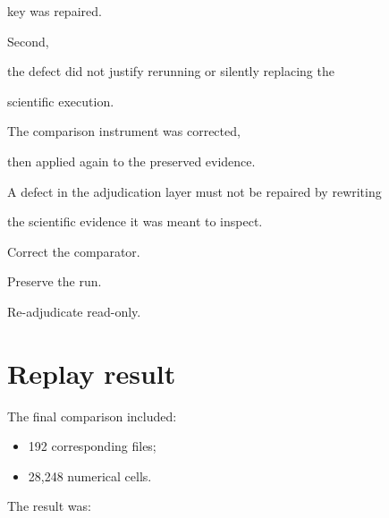 \documentclass[11pt,a4paper,oneside]{report}
\begin{document}
key was repaired.



Second,

the defect did not justify rerunning or silently replacing the

scientific execution.



The comparison instrument was corrected,

then applied again to the preserved evidence.





\begin{governingrule}



A defect in the adjudication layer must not be repaired by rewriting

the scientific evidence it was meant to inspect.



Correct the comparator.



Preserve the run.



Re-adjudicate read-only.



\end{governingrule}





\section{Replay result}



The final comparison included:



\begin{itemize}



\item

192 corresponding files;



\item

28,248 numerical cells.



\end{itemize}



The result was:
\end{document}
